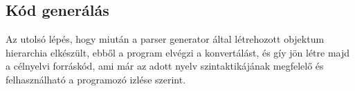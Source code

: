 \subsection{Kód generálás}

Az utolsó lépés, hogy miután a parser generator által létrehozott objektum hierarchia elkészült, ebből a program elvégzi a konvertálást, és gíy jön létre majd a célnyelvi forráskód, ami már az adott nyelv szintaktikájának megfelelő és felhasználható a programozó izlése szerint.
